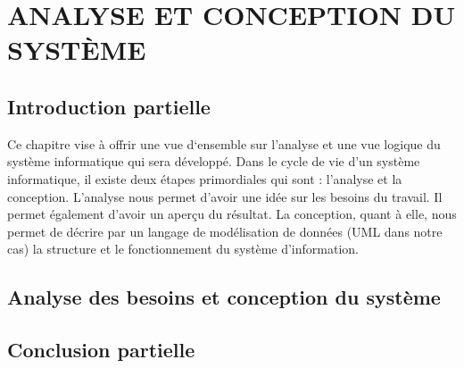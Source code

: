 \chapter[ANALYSE ET CONCEPTION DU SYSTÈME]{ANALYSE ET CONCEPTION DU SYSTÈME}
    \section[Introduction partielle]{Introduction partielle}
    Ce chapitre vise à offrir une vue d‘ensemble sur l’analyse et une vue logique du
    système informatique qui sera développé. Dans le cycle de vie d’un système informatique,
    il existe deux étapes primordiales qui sont : l’analyse et la conception. L’analyse nous
    permet d’avoir une idée sur les besoins du travail. Il permet également d’avoir un aperçu
    du résultat. La conception, quant à elle, nous permet de décrire par un langage de
    modélisation de données (UML dans notre cas) la structure et le fonctionnement du
    système d’information.
    \section[Analyse des besoins et conception du système]{Analyse des besoins et conception du système}
        
        
        
    \section[Conclusion partielle]{Conclusion partielle}